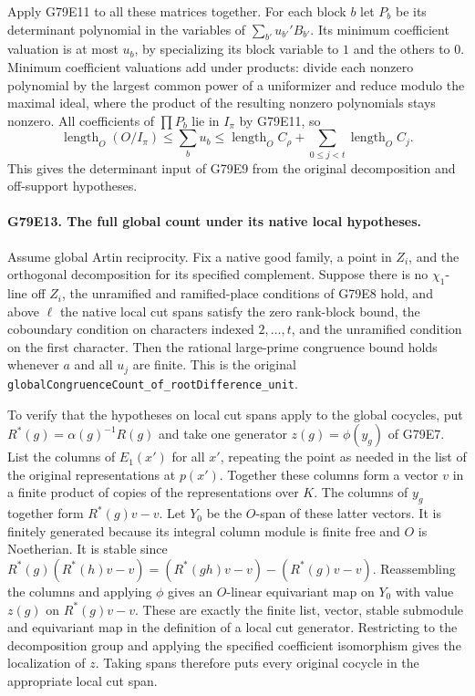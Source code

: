 Apply G79E11 to all these matrices together. For each block $b$
let $P_b$ be its determinant polynomial in the variables of
$\sum_{b'} u_{b'}' B_{b'}$. Its minimum coefficient valuation is
at most $u_b$, by specializing its block variable to $1$ and the
others to $0$. Minimum coefficient valuations add under products:
divide each nonzero polynomial by the largest common power of a
uniformizer and reduce modulo the maximal ideal, where the product
of the resulting nonzero polynomials stays nonzero. All coefficients
of $\prod P_b$ lie in $I_\pi$ by G79E11, so
\[
 \operatorname{length}_O(O/I_\pi)\le
 \sum_b u_b\le\operatorname{length}_O C_\rho+
                 \sum_{0\le j<t}\operatorname{length}_O C_j .
\]
This gives the determinant input of G79E9 from the original
decomposition and off-support hypotheses.

\paragraph{G79E13. The full global count under its native local hypotheses.}
Assume global Artin reciprocity. Fix a native good family, a point
in $Z_i$, and the orthogonal decomposition for its specified
complement. Suppose there is no $\chi_1$-line off $Z_i$, the
unramified and ramified-place conditions of G79E8 hold, and above
$\ell$ the native local cut spans satisfy the zero rank-block
bound, the coboundary condition on characters indexed $2,\ldots,t$,
and the unramified condition on the first character.
Then the rational large-prime congruence bound holds whenever
$a$ and all $u_j$ are finite. This is the original
\texttt{globalCongruenceCount\_}\allowbreak\texttt{of\_rootDifference\_}\allowbreak\texttt{unit}.

To verify that the hypotheses on local cut spans apply to the
global cocycles, put $R^*(g)=\alpha(g)^{-1}R(g)$ and take one
generator $z(g)=\phi(y_g)$ of G79E7. List the columns of $E_1(x')$
for all $x'$, repeating the point as needed in the list of the
original representations at $p(x')$. Together these columns form
a vector $v$ in a finite product of copies of the representations
over $K$. The columns of $y_g$ together form $R^*(g)v-v$.
Let $Y_0$ be the $O$-span of these latter vectors. It is finitely
generated because its integral column module is finite free and
$O$ is Noetherian. It is stable since
$R^*(g)(R^*(h)v-v)=(R^*(gh)v-v)-(R^*(g)v-v)$.
Reassembling the columns and applying $\phi$ gives an
$O$-linear equivariant map on $Y_0$ with value $z(g)$ on
$R^*(g)v-v$. These are exactly the finite list, vector, stable
submodule and equivariant map in the definition of a local cut
generator. Restricting to the decomposition group and applying
the specified coefficient isomorphism gives the localization of
$z$. Taking spans therefore puts every original cocycle in the
appropriate local cut span.

